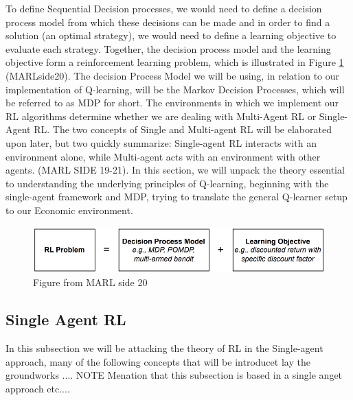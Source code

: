 \documentclass{article}
\begin{document}
\newline
To define Sequential Decision processes, we would need to define a decision process model from which these decisions can be made and in order to find a solution (an optimal strategy), we would need to define a learning objective to evaluate each strategy. Together, the decision process model and the learning objective form a reinforcement learning problem, which is illustrated in Figure \ref{fig:MARLside20} (MARLside20). The decision Process Model we will be using, in relation to our implementation of Q-learning, will be the Markov Decision Processes, which will be referred to as MDP for short.
\newline 
\newline
The environments in which we implement our RL algorithms determine whether we are dealing with Multi-Agent RL or Single-Agent RL. The two concepts of Single and Multi-agent RL will be elaborated upon later, but two quickly summarize: Single-agent RL interacts with an environment alone, while  Multi-agent acts with an environment with other agents. (MARL SIDE 19-21).
In this section, we will unpack the theory essential to understanding the underlying principles of Q-learning, beginning with the single-agent framework and MDP, trying to translate the general Q-learner setup to our Economic environment. 
\begin{figure}
    \centering
    \includegraphics[width=0.5\linewidth]{MARLside20.png}
    \caption{Figure from MARL side 20 }
    \label{fig:MARLside20}
\end{figure}
\subsection{Single Agent RL}
In this subsection we will be attacking the theory of RL in the Single-agent approach, many of the following concepts that will be introducet  lay the groundworks .... NOTE Menation that this subsection is based in a single anget approach etc....
\end{document}

